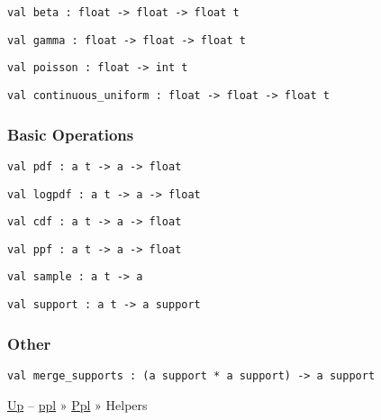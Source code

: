 \protect\hyperlink{val-beta}{}\texttt{val\ beta\ :\ float\ -\textgreater{}\ float\ -\textgreater{}\ float\ t}

\protect\hyperlink{val-gamma}{}\texttt{val\ gamma\ :\ float\ -\textgreater{}\ float\ -\textgreater{}\ float\ t}

\protect\hyperlink{val-poisson}{}\texttt{val\ poisson\ :\ float\ -\textgreater{}\ int\ t}

\protect\hyperlink{val-continuousux5funiform}{}\texttt{val\ continuous\_uniform\ :\ float\ -\textgreater{}\ float\ -\textgreater{}\ float\ t}

\hypertarget{basicux5fops}{\subsubsection{\texorpdfstring{\protect\hyperlink{basicux5fops}{}Basic
Operations}{Basic Operations}}\label{basicux5fops}}

\protect\hyperlink{val-pdf}{}\texttt{val\ pdf\ :\ \textquotesingle{}a\ t\ -\textgreater{}\ \textquotesingle{}a\ -\textgreater{}\ float}

\protect\hyperlink{val-logpdf}{}\texttt{val\ logpdf\ :\ \textquotesingle{}a\ t\ -\textgreater{}\ \textquotesingle{}a\ -\textgreater{}\ float}

\protect\hyperlink{val-cdf}{}\texttt{val\ cdf\ :\ \textquotesingle{}a\ t\ -\textgreater{}\ \textquotesingle{}a\ -\textgreater{}\ float}

\protect\hyperlink{val-ppf}{}\texttt{val\ ppf\ :\ \textquotesingle{}a\ t\ -\textgreater{}\ \textquotesingle{}a\ -\textgreater{}\ float}

\protect\hyperlink{val-sample}{}\texttt{val\ sample\ :\ \textquotesingle{}a\ t\ -\textgreater{}\ \textquotesingle{}a}

\protect\hyperlink{val-support}{}\texttt{val\ support\ :\ \textquotesingle{}a\ t\ -\textgreater{}\ \textquotesingle{}a\ support}

\hypertarget{primux5fother}{\subsubsection{\texorpdfstring{\protect\hyperlink{primux5fother}{}Other}{Other}}\label{primux5fother}}

\protect\hyperlink{val-mergeux5fsupports}{}\texttt{val\ merge\_supports\ :\ (\textquotesingle{}a\ support\ *\ \textquotesingle{}a\ support)\ -\textgreater{}\ \textquotesingle{}a\ support}

\href{../index.html}{Up} -- \href{../../index.html}{ppl} »
\href{../index.html}{Ppl} » Helpers

